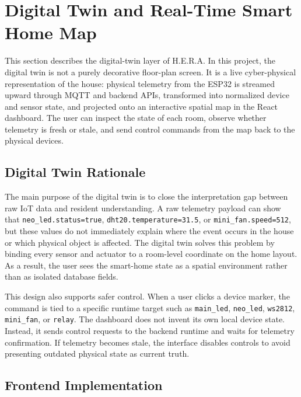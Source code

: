 \newpage
\section{Digital Twin and Real-Time Smart Home Map}
\label{sec:digital-twin}

This section describes the digital-twin layer of H.E.R.A. In this project, the digital twin is not a purely decorative floor-plan screen. It is a live cyber-physical representation of the house: physical telemetry from the ESP32 is streamed upward through MQTT and backend APIs, transformed into normalized device and sensor state, and projected onto an interactive spatial map in the React dashboard. The user can inspect the state of each room, observe whether telemetry is fresh or stale, and send control commands from the map back to the physical devices.

\subsection{Digital Twin Rationale}

The main purpose of the digital twin is to close the interpretation gap between raw IoT data and resident understanding. A raw telemetry payload can show that \texttt{neo\_led.status=true}, \texttt{dht20.temperature=31.5}, or \texttt{mini\_fan.speed=512}, but these values do not immediately explain where the event occurs in the house or which physical object is affected. The digital twin solves this problem by binding every sensor and actuator to a room-level coordinate on the home layout. As a result, the user sees the smart-home state as a spatial environment rather than as isolated database fields.

This design also supports safer control. When a user clicks a device marker, the command is tied to a specific runtime target such as \texttt{main\_led}, \texttt{neo\_led}, \texttt{ws2812}, \texttt{mini\_fan}, or \texttt{relay}. The dashboard does not invent its own local device state. Instead, it sends control requests to the backend runtime and waits for telemetry confirmation. If telemetry becomes stale, the interface disables controls to avoid presenting outdated physical state as current truth.

\subsection{Frontend Implementation}

